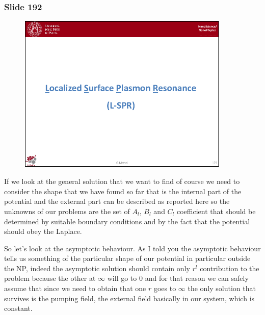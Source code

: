 \documentclass[../main/main.tex]{subfiles}
\begin{document}
\newpage
\subsubsection{Slide 192}

\begin{figure}[h!]
\centering
\includegraphics[page=14,width=0.9\textwidth]{../lessons/pdf_file/11_lesson.pdf}
\end{figure}

If we look at the general solution that we want to find of course we need to consider the shape that we have found so far that is the internal part of the potential and the external part can be described as reported here so the unknowns of our problems are the set of $A_l$, $B_l$ and $C_l$ coefficient that should be determined by suitable boundary conditions and by the fact that the potential should obey the Laplace. 

So let's look at the asymptotic behaviour. As I told you the asymptotic behaviour tells us something of the particular shape of our potential in particular outside the NP, indeed the asymptotic solution should contain only $r^l$ contribution to the problem because the other at $\infty$ will go to $0$ and for that reason we can safely assume that since we need to obtain that one $r$ goes to $\infty$ the only solution that survives is the pumping field, the external field basically in our system, which is constant.
\end{document}
